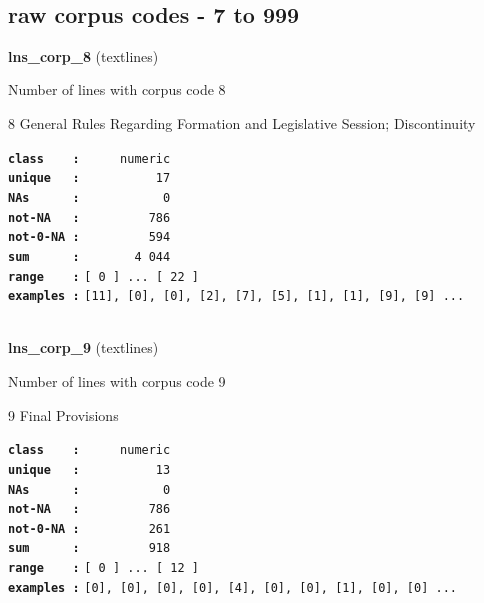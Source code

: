\documentclass[]{article}
\begin{document}
~

\subsection{raw corpus codes - 7 to
999}\label{raw-corpus-codes---7-to-999}

\textbf{lns\_corp\_8} (textlines)

Number of lines with corpus code 8

8 General Rules Regarding Formation and Legislative Session;
Discontinuity

\textbf{\texttt{class\ \ \ \ :}} \texttt{~~~~~numeric}\\
\textbf{\texttt{unique\ \ \ :}} \texttt{~~~~~~~~~~17}\\
\textbf{\texttt{NAs\ \ \ \ \ \ :}} \texttt{~~~~~~~~~~~0}\\
\textbf{\texttt{not-NA\ \ \ :}} \texttt{~~~~~~~~~786}\\
\textbf{\texttt{not-0-NA\ :}} \texttt{~~~~~~~~~594}\\
\textbf{\texttt{sum\ \ \ \ \ \ :}} \texttt{~~~~~~~4~044}\\
\textbf{\texttt{range\ \ \ \ :}}
\texttt{{[}\ 0\ {]}\ ...\ {[}\ 22\ {]}}\\
\textbf{\texttt{examples\ :}}
\texttt{{[}11{]},\ {[}0{]},\ {[}0{]},\ {[}2{]},\ {[}7{]},\ {[}5{]},\ {[}1{]},\ {[}1{]},\ {[}9{]},\ {[}9{]}\ ...}\\

~

\textbf{lns\_corp\_9} (textlines)

Number of lines with corpus code 9

9 Final Provisions

\textbf{\texttt{class\ \ \ \ :}} \texttt{~~~~~numeric}\\
\textbf{\texttt{unique\ \ \ :}} \texttt{~~~~~~~~~~13}\\
\textbf{\texttt{NAs\ \ \ \ \ \ :}} \texttt{~~~~~~~~~~~0}\\
\textbf{\texttt{not-NA\ \ \ :}} \texttt{~~~~~~~~~786}\\
\textbf{\texttt{not-0-NA\ :}} \texttt{~~~~~~~~~261}\\
\textbf{\texttt{sum\ \ \ \ \ \ :}} \texttt{~~~~~~~~~918}\\
\textbf{\texttt{range\ \ \ \ :}}
\texttt{{[}\ 0\ {]}\ ...\ {[}\ 12\ {]}}\\
\textbf{\texttt{examples\ :}}
\texttt{{[}0{]},\ {[}0{]},\ {[}0{]},\ {[}0{]},\ {[}4{]},\ {[}0{]},\ {[}0{]},\ {[}1{]},\ {[}0{]},\ {[}0{]}\ ...}\\
\end{document}
